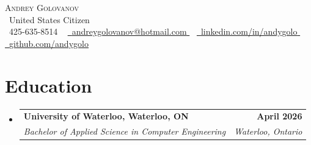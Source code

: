 \documentclass[letterpaper,12pt]{article}
\makeatletter
\newcommand{\resumeSubheading}[4]{
  \vspace{-4pt}\item
    \begin{tabular*}{1.0\textwidth}[t]{l@{\extracolsep{\fill}}r}
      \color{blue_egypt}
      \textbf{#1} & \textbf{\small #2} \\
      \textit{\normalsize#3} & \textit{\small #4} \\
    \end{tabular*}\vspace{-8pt}
}
\newcommand{\resumeSubHeadingListStart}{\begin{itemize}[leftmargin=0.0in, label={}]}
\newcommand{\resumeSubHeadingListEnd}{\end{itemize}}
\makeatother
\begin{document}

\begin{center}
    \vspace{-10pt} %
    {\Huge \scshape Andrey Golovanov} \\[2pt] %
    {\normalsize \raisebox{-0.1\height}\faGlobe\ United States Citizen} \\[2pt]
    \small 
    \raisebox{-0.1\height}\faPhone\ 425-635-8514 ~ 
    \href{mailto:andreygolovanov@hotmail.com}{
        \raisebox{-0.2\height}\faEnvelope\ \underline{andreygolovanov@hotmail.com}
    } ~ 
    \href{https://linkedin.com/in/andygolo}{
        \raisebox{-0.2\height}\faLinkedin\ \underline{linkedin.com/in/andygolo}
    } ~
    \href{https://github.com/andygolo}{
        \raisebox{-0.2\height}\faGithub\ \underline{github.com/andygolo}
    } 
        \vspace{-10pt}
\end{center}
\section{\color{blue_head}Education}
  \resumeSubHeadingListStart
     \vspace{0pt}

    \resumeSubheading
      {University of Waterloo, Waterloo, ON}{April 2026}
      {Bachelor of Applied Science in Computer Engineering}{Waterloo, Ontario}
  \resumeSubHeadingListEnd
   \vspace{-10pt}
\end{document}
